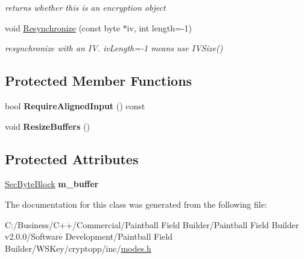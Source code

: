 \begin{DoxyCompactItemize}
\begin{DoxyCompactList}\small\item\em returns whether this is an encryption object \item\end{DoxyCompactList}\item 
\hypertarget{class_block_oriented_cipher_mode_base_af56879c9784d5f70120f46fb60941b9f}{
void \hyperlink{class_block_oriented_cipher_mode_base_af56879c9784d5f70120f46fb60941b9f}{Resynchronize} (const byte $\ast$iv, int length=-\/1)}
\label{class_block_oriented_cipher_mode_base_af56879c9784d5f70120f46fb60941b9f}

\begin{DoxyCompactList}\small\item\em resynchronize with an IV. ivLength=-\/1 means use IVSize() \item\end{DoxyCompactList}\end{DoxyCompactItemize}
\subsection*{Protected Member Functions}
\begin{DoxyCompactItemize}
\item 
\hypertarget{class_block_oriented_cipher_mode_base_aae1f2f96e712bc8830ca427a768c2b54}{
bool {\bfseries RequireAlignedInput} () const }
\label{class_block_oriented_cipher_mode_base_aae1f2f96e712bc8830ca427a768c2b54}

\item 
\hypertarget{class_block_oriented_cipher_mode_base_a4e567f03f82e6108065a1316de50e1cf}{
void {\bfseries ResizeBuffers} ()}
\label{class_block_oriented_cipher_mode_base_a4e567f03f82e6108065a1316de50e1cf}

\end{DoxyCompactItemize}
\subsection*{Protected Attributes}
\begin{DoxyCompactItemize}
\item 
\hypertarget{class_block_oriented_cipher_mode_base_a4c6c74ef76c66ac97ec7f3409dde8f28}{
\hyperlink{class_sec_block}{SecByteBlock} {\bfseries m\_\-buffer}}
\label{class_block_oriented_cipher_mode_base_a4c6c74ef76c66ac97ec7f3409dde8f28}

\end{DoxyCompactItemize}


The documentation for this class was generated from the following file:\begin{DoxyCompactItemize}
\item 
C:/Business/C++/Commercial/Paintball Field Builder/Paintball Field Builder v2.0.0/Software Development/Paintball Field Builder/WSKey/cryptopp/inc/\hyperlink{modes_8h}{modes.h}\end{DoxyCompactItemize}
